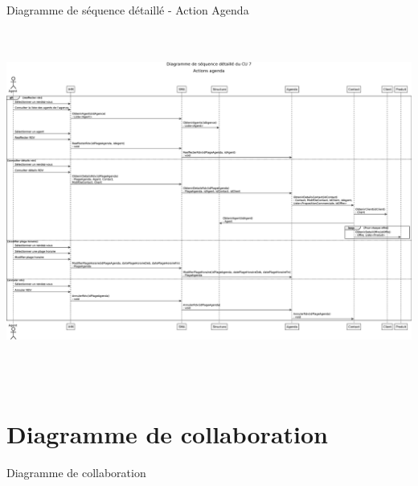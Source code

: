 \documentclass[xetex]{beamer}
\begin{document}
     \begin{frame}{Diagramme de séquence détaillé - Action Agenda}
  {\includegraphics[height=12cm]{../report/figures/eps/DSD_CU7_ActionsAgenda}}
    \end{frame}
    
    
    \section{Diagramme de collaboration}
    \begin{frame}{Diagramme de collaboration}
\noindent{}
    \end{frame}
    
\end{document}
